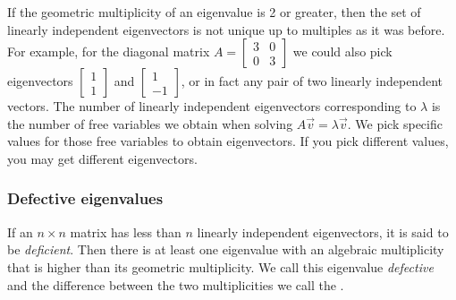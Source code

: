 If the geometric multiplicity of an eigenvalue is 2 or greater,
then the set of linearly independent eigenvectors is not unique up to
multiples as it was before.  For example, for the diagonal matrix $A =
\left[ \begin{smallmatrix} 3 & 0 \\ 0 & 3 \end{smallmatrix} \right]$
we could also pick eigenvectors
$\left[ \begin{smallmatrix} 1 \\ 1 \end{smallmatrix} \right]$
and
$\left[ \begin{smallmatrix} 1 \\ -1 \end{smallmatrix} \right]$, or in fact
any pair of two linearly independent vectors.  The number of linearly
independent eigenvectors corresponding to $\lambda$
is the number of free variables we obtain when solving $A\vec{v} =
\lambda \vec{v}$.  We pick specific values for those free variables to
obtain eigenvectors.  If you pick different values, you may get different
eigenvectors.


\subsubsection{Defective eigenvalues}

If an $n \times n$ matrix has less than $n$ linearly independent
eigenvectors, it is said to be \emph{deficient}.
Then there is at least
one eigenvalue with an algebraic multiplicity that is higher than its geometric
multiplicity.  We call this eigenvalue \emph{defective}
and the difference
between the two multiplicities we call the \emph{}.

